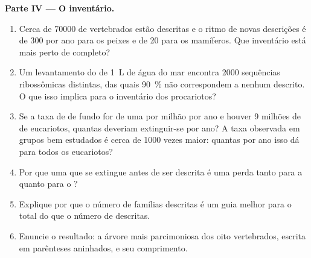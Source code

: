 \begin{problem}
\medskip
\noindent\textbf{Parte IV --- O inventário.}
\begin{enumerate}[resume]
  \item Cerca de \num{70000}  de vertebrados estão descritas e
        o ritmo de novas descrições é de \num{300} por ano para os
        peixes e de \num{20} para os mamíferos. Que inventário está
        mais perto de completo?
  \item Um levantamento do  de \qty{1}{L} de água do mar encontra
        \num{2000} sequências ribossômicas distintas, das quais
        \qty{90}{\%} não correspondem a nenhum  descrito. O
        que isso implica para o inventário dos procariotos?
  \item Se a taxa de  de fundo for de uma  por milhão
        por ano e houver \num{9} milhões de  de eucariotos,
        quantas deveriam extinguir-se por ano? A taxa observada em
        grupos bem estudados é cerca de \num{1000} vezes maior:
        quantas por ano isso dá para todos os eucariotos?
  \item Por que uma  que se extingue antes de ser descrita é
        uma perda tanto para a  quanto para o ?
  \item Explique por que o número de famílias descritas é um guia
        melhor para o total do que o número de  descritas.
  \item Enuncie o resultado: a árvore mais parcimoniosa dos oito
        vertebrados, escrita em parênteses aninhados, e seu comprimento.
\end{enumerate}
\end{problem}
